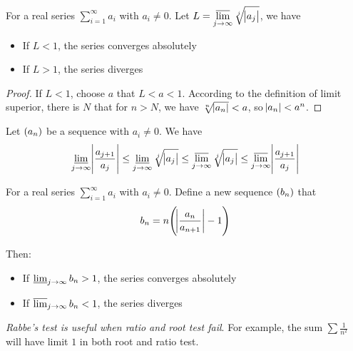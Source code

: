 \begin{theorem}
    For a real series $\sum_{i=1}^\infty a_i$ with $a_i \neq 0$. Let $\displaystyle L = \varlimsup_{j \rightarrow \infty}  \sqrt[j]{\abs{a_j}}$, we have
    \begin{itemize}
        \item If $L < 1$, the series converges absolutely
        \item If $L > 1$, the series diverges
    \end{itemize}
\end{theorem}
\begin{proof}
    If $L < 1$, choose $a$ that $L < a < 1$. According to the definition of limit superior, there is $N$ that for $n > N$, we have $\sqrt[n]{\abs{a_n}} < a$, so $\abs{a_n} < a^n$.
\end{proof}

\begin{theorem}
    Let $\sequence{a_n}$ be a sequence with $a_i \neq 0$. We have
    \begin{equation}
        \varliminf_{j \rightarrow \infty} \abs{\frac{a_{j+1}}{a_j}} \leq \varliminf_{j \rightarrow \infty}  \sqrt[j]{\abs{a_j}} \leq \varlimsup_{j \rightarrow \infty}  \sqrt[j]{\abs{a_j}} \leq \varlimsup_{j \rightarrow \infty} \abs{\frac{a_{j+1}}{a_j}}
    \end{equation}
\end{theorem}


\begin{theorem}
    For a real series $\sum_{i=1}^\infty a_i$ with $a_i \neq 0$. Define a new sequence $\sequence{b_n}$ that
    \begin{equation}
        b_n = n \mleft( \absolutevalue{\frac{a_n}{a_{n+1}}} - 1 \mright)
    \end{equation}
    
    Then:
    \begin{itemize}
        \item If $\varliminf_{j \rightarrow \infty} b_n > 1$, the series converges absolutely
        \item If $\varlimsup_{j \rightarrow \infty} b_n < 1$, the series diverges
    \end{itemize}
    
    \emph{Rabbe's test is useful when ratio and root test fail}. For example, the sum $\sum \frac{1}{n^2}$ will have limit $1$ in both root and ratio test.
\end{theorem}



